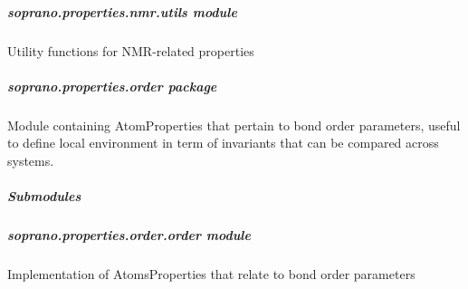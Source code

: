 \documentclass[letterpaper,10pt,english]{sphinxmanual}
\begin{document}
\begin{fulllineitems}
\begin{fulllineitems}
\label{doctree/soprano.properties.nmr.ms:soprano.properties.nmr.ms.MSSpan.default_name}
\end{fulllineitems}


\begin{fulllineitems}
\label{doctree/soprano.properties.nmr.ms:soprano.properties.nmr.ms.MSSpan.default_params}
\end{fulllineitems}


\begin{fulllineitems}
\label{doctree/soprano.properties.nmr.ms:soprano.properties.nmr.ms.MSSpan.extract}
\end{fulllineitems}


\end{fulllineitems}



\subparagraph{soprano.properties.nmr.utils module}
\label{doctree/soprano.properties.nmr.utils:soprano-properties-nmr-utils-module}\label{doctree/soprano.properties.nmr.utils:module-soprano.properties.nmr.utils}\label{doctree/soprano.properties.nmr.utils::doc}
Utility functions for NMR-related properties


\subparagraph{soprano.properties.order package}
\label{doctree/soprano.properties.order:module-soprano.properties.order}\label{doctree/soprano.properties.order:soprano-properties-order-package}\label{doctree/soprano.properties.order::doc}
Module containing AtomProperties that pertain to bond order parameters, useful
to define local environment in term of invariants that can be compared across
systems.


\subparagraph{Submodules}
\label{doctree/soprano.properties.order:submodules}

\subparagraph{soprano.properties.order.order module}
\label{doctree/soprano.properties.order.order:module-soprano.properties.order.order}\label{doctree/soprano.properties.order.order::doc}\label{doctree/soprano.properties.order.order:soprano-properties-order-order-module}
Implementation of AtomsProperties that relate to bond order parameters
\end{document}
